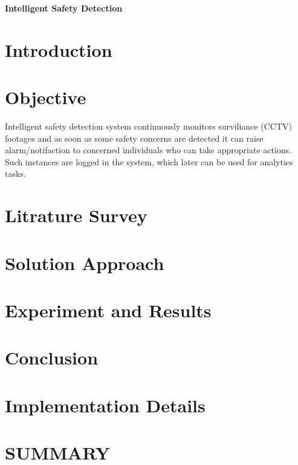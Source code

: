 \documentclass[a4paper, 12pt]{article}
\begin{document}
\begin{titlepage}
    \centering
    \vspace*{\fill}

    \vspace*{0.5cm}

    \huge\bfseries
    Intelligent Safety Detection\\
    \vspace*{0.5cm}


    \vspace*{\fill}
\end{titlepage}
\newpage
\section{Introduction}

\section{Objective}
Intelligent safety detection system continuously monitors surviliance (CCTV) footages and as soon as some safety concerns are 
detected it can raise alarm/notifaction to concerned individuals who can take appropriate actions. Such instances are logged in the system, which
later can be used for analytics tasks.

\section{Litrature Survey}

\section{Solution Approach}

\section{Experiment and Results}

\section{Conclusion}

\section{Implementation Details}

\section{SUMMARY}
\end{document}
